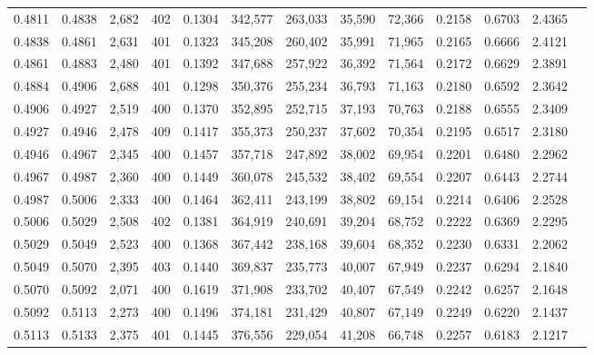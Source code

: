 \begin{tabular}{rrrrrrrrrrrrr}
0.4811 & 0.4838 & 2,682 & 402 &                                     0.1304 & 342,577 & 263,033 &  35,590 &  72,366 & 0.2158 & 0.6703 & 2.4365 \\
0.4838 & 0.4861 & 2,631 & 401 &                                     0.1323 & 345,208 & 260,402 &  35,991 &  71,965 & 0.2165 & 0.6666 & 2.4121 \\
0.4861 & 0.4883 & 2,480 & 401 &                                     0.1392 & 347,688 & 257,922 &  36,392 &  71,564 & 0.2172 & 0.6629 & 2.3891 \\
0.4884 & 0.4906 & 2,688 & 401 &                                     0.1298 & 350,376 & 255,234 &  36,793 &  71,163 & 0.2180 & 0.6592 & 2.3642 \\
0.4906 & 0.4927 & 2,519 & 400 &                                     0.1370 & 352,895 & 252,715 &  37,193 &  70,763 & 0.2188 & 0.6555 & 2.3409 \\
0.4927 & 0.4946 & 2,478 & 409 &                                     0.1417 & 355,373 & 250,237 &  37,602 &  70,354 & 0.2195 & 0.6517 & 2.3180 \\
0.4946 & 0.4967 & 2,345 & 400 &                                     0.1457 & 357,718 & 247,892 &  38,002 &  69,954 & 0.2201 & 0.6480 & 2.2962 \\
0.4967 & 0.4987 & 2,360 & 400 &                                     0.1449 & 360,078 & 245,532 &  38,402 &  69,554 & 0.2207 & 0.6443 & 2.2744 \\
0.4987 & 0.5006 & 2,333 & 400 &                                     0.1464 & 362,411 & 243,199 &  38,802 &  69,154 & 0.2214 & 0.6406 & 2.2528 \\
0.5006 & 0.5029 & 2,508 & 402 &                                     0.1381 & 364,919 & 240,691 &  39,204 &  68,752 & 0.2222 & 0.6369 & 2.2295 \\
0.5029 & 0.5049 & 2,523 & 400 &                                     0.1368 & 367,442 & 238,168 &  39,604 &  68,352 & 0.2230 & 0.6331 & 2.2062 \\
0.5049 & 0.5070 & 2,395 & 403 &                                     0.1440 & 369,837 & 235,773 &  40,007 &  67,949 & 0.2237 & 0.6294 & 2.1840 \\
0.5070 & 0.5092 & 2,071 & 400 &                                     0.1619 & 371,908 & 233,702 &  40,407 &  67,549 & 0.2242 & 0.6257 & 2.1648 \\
0.5092 & 0.5113 & 2,273 & 400 &                                     0.1496 & 374,181 & 231,429 &  40,807 &  67,149 & 0.2249 & 0.6220 & 2.1437 \\
0.5113 & 0.5133 & 2,375 & 401 &                                     0.1445 & 376,556 & 229,054 &  41,208 &  66,748 & 0.2257 & 0.6183 & 2.1217 \\

\end{tabular}
